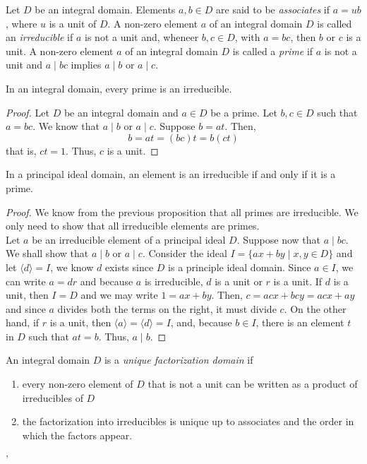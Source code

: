 \begin{definition}
	Let $D$ be an integral domain. Elements $a,b\in D$ are said to be \textit{associates} if $a=ub$, where $u$ is a unit of $D$. A non-zero element $a$ of an integral domain $D$ is called an \textit{irreducible} if $a$ is not a unit and, wheneer $b,c\in D$, with $a=bc$, then $b$ or $c$ is a unit. A non-zero element $a$ of an integral domain $D$ is called a \textit{prime} if $a$ is not a unit and $a\mid bc$ implies $a\mid b$ or $a\mid c$.
\end{definition}

\begin{proposition}
	In an integral domain, every prime is an irreducible.
\end{proposition}
\begin{proof}
	Let $D$ be an integral domain and $a\in D$ be a prime. Let $b,c\in D$ such that $a=bc$. We know that $a\mid b$ or $a\mid c$. Suppose $b=at$. Then, 
	\begin{equation*}
		b = at = (bc)t = b(ct)
	\end{equation*}
	that is, $ct = 1$. Thus, $c$ is a unit.
\end{proof}

\begin{proposition}
	In a principal ideal domain, an element is an irreducible if and only if it is a prime.
\end{proposition}
\begin{proof}
	We know from the previous proposition that all primes are irreducible. We only need to show that all irreducible elements are primes.\\
	Let $a$ be an irreducible element of a principal ideal $D$. Suppose now that $a\mid bc$. We shall show that $a\mid b$ or $a\mid c$. Consider the ideal $I=\{ax+by\mid x,y\in D\}$ and let $\langle d\rangle = I$, we know $d$ exists since $D$ is a principle ideal domain. Since $a\in I$, we can write $a=dr$ and because $a$ is irreducible, $d$ is a unit or $r$ is a unit. If $d$ is a unit, then $I=D$ and we may write $1=ax+by$. Then, $c = acx+bcy = acx+ay$ and since $a$ divides both the terms on the right, it must divide $c$. On the other hand, if $r$ is a unit, then $\langle a\rangle = \langle d\rangle= I$, and, because $b\in I$, there is an element $t$ in $D$ such that $at=b$. Thus, $a\mid b$.
\end{proof}

\begin{definition}
	An integral domain $D$ is a \textit{unique factorization domain} if 
	\begin{enumerate}
		\item every non-zero element of $D$ that is not a unit can be written as a product of irreducibles of $D$
		\item the factorization into irreducibles is unique up to associates and the order in which the factors appear.
	\end{enumerate}
\end{definition}'

